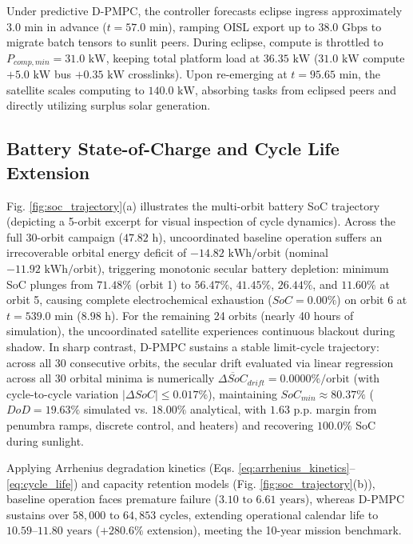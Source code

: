 \documentclass[journal]{IEEEtran}
\begin{document}
Under predictive D-PMPC, the controller forecasts eclipse ingress approximately $3.0\text{ min}$ in advance ($t = 57.0\text{ min}$), ramping OISL export up to $38.0\text{ Gbps}$ to migrate batch tensors to sunlit peers. During eclipse, compute is throttled to $P_{comp,min} = 31.0\text{ kW}$, keeping total platform load at $36.35\text{ kW}$ ($31.0\text{ kW}$ compute $+ 5.0\text{ kW}$ bus $+ 0.35\text{ kW}$ crosslinks). Upon re-emerging at $t = 95.65\text{ min}$, the satellite scales computing to $140.0\text{ kW}$, absorbing tasks from eclipsed peers and directly utilizing surplus solar generation.

\subsection{Battery State-of-Charge and Cycle Life Extension}
Fig. \ref{fig:soc_trajectory}(a) illustrates the multi-orbit battery SoC trajectory (depicting a 5-orbit excerpt for visual inspection of cycle dynamics). Across the full 30-orbit campaign ($47.82\text{ h}$), uncoordinated baseline operation suffers an irrecoverable orbital energy deficit of $-14.82\text{ kWh/orbit}$ (nominal $-11.92\text{ kWh/orbit}$), triggering monotonic secular battery depletion: minimum SoC plunges from $71.48\%$ (orbit 1) to $56.47\%$, $41.45\%$, $26.44\%$, and $11.60\%$ at orbit 5, causing complete electrochemical exhaustion ($SoC = 0.00\%$) on orbit 6 at $t = 539.0\text{ min}$ ($8.98\text{ h}$). For the remaining 24 orbits (nearly 40 hours of simulation), the uncoordinated satellite experiences continuous blackout during shadow. In sharp contrast, D-PMPC sustains a stable limit-cycle trajectory: across all 30 consecutive orbits, the secular drift evaluated via linear regression across all 30 orbital minima is numerically $\overline{\Delta SoC}_{drift} = 0.0000\%/\text{orbit}$ (with cycle-to-cycle variation $|\Delta SoC| \le 0.017\%$), maintaining $SoC_{min} \approx 80.37\%$ ($DoD = 19.63\%$ simulated vs. $18.00\%$ analytical, with $1.63\text{ p.p.}$ margin from penumbra ramps, discrete control, and heaters) and recovering $100.0\%$ SoC during sunlight.

Applying Arrhenius degradation kinetics (Eqs. \ref{eq:arrhenius_kinetics}--\ref{eq:cycle_life}) and capacity retention models (Fig. \ref{fig:soc_trajectory}(b)), baseline operation faces premature failure ($3.10\text{ to }6.61\text{ years}$), whereas D-PMPC sustains over $58,000\text{ to }64,853\text{ cycles}$, extending operational calendar life to $10.59\text{--}11.80\text{ years}$ ($+280.6\%$ extension), meeting the 10-year mission benchmark.
\end{document}
